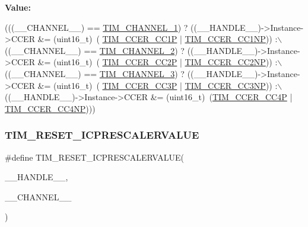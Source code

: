 {\bfseries Value\+:}
\begin{DoxyCode}
(((\_\_CHANNEL\_\_) == \hyperlink{group___t_i_m___channel_ga6b1541e4a49d62610899e24bf23f4879}{TIM\_CHANNEL\_1}) ? ((\_\_HANDLE\_\_)->Instance->CCER &= (uint16\_t)~(
      \hyperlink{group___peripheral___registers___bits___definition_ga0ca0aedba14241caff739afb3c3ee291}{TIM\_CCER\_CC1P} | \hyperlink{group___peripheral___registers___bits___definition_ga403fc501d4d8de6cabee6b07acb81a36}{TIM\_CCER\_CC1NP})) :\(\backslash\)
 ((\_\_CHANNEL\_\_) == \hyperlink{group___t_i_m___channel_ga33e02d43345a7ac5886f01b39e4f7ccd}{TIM\_CHANNEL\_2}) ? ((\_\_HANDLE\_\_)->Instance->CCER &= (uint16\_t)~(
      \hyperlink{group___peripheral___registers___bits___definition_ga3136c6e776c6066509d298b6a9b34912}{TIM\_CCER\_CC2P} | \hyperlink{group___peripheral___registers___bits___definition_ga387de559d8b16b16f3934fddd2aa969f}{TIM\_CCER\_CC2NP})) :\(\backslash\)
 ((\_\_CHANNEL\_\_) == \hyperlink{group___t_i_m___channel_ga4ea100c1789b178f3cb46721b7257e2d}{TIM\_CHANNEL\_3}) ? ((\_\_HANDLE\_\_)->Instance->CCER &= (uint16\_t)~(
      \hyperlink{group___peripheral___registers___bits___definition_ga6220a5cd34c7a7a39e10c854aa00d2e5}{TIM\_CCER\_CC3P} | \hyperlink{group___peripheral___registers___bits___definition_ga4029686d3307111d3f9f4400e29e4521}{TIM\_CCER\_CC3NP})) :\(\backslash\)
 ((\_\_HANDLE\_\_)->Instance->CCER &= (uint16\_t)~(\hyperlink{group___peripheral___registers___bits___definition_ga3faf23dc47e1b0877352d7f5a00f72e1}{TIM\_CCER\_CC4P} | 
      \hyperlink{group___peripheral___registers___bits___definition_ga41b88bff3f38cec0617ce66fa5aef260}{TIM\_CCER\_CC4NP})))
\end{DoxyCode}
\mbox{\label{group___t_i_m___private___macros_ga18ded32faf42c8981c8d2970bb02e126}} 
\subsubsection{\texorpdfstring{T\+I\+M\+\_\+\+R\+E\+S\+E\+T\+\_\+\+I\+C\+P\+R\+E\+S\+C\+A\+L\+E\+R\+V\+A\+L\+UE}{TIM\_RESET\_ICPRESCALERVALUE}}
{\footnotesize\ttfamily \#define T\+I\+M\+\_\+\+R\+E\+S\+E\+T\+\_\+\+I\+C\+P\+R\+E\+S\+C\+A\+L\+E\+R\+V\+A\+L\+UE(\begin{DoxyParamCaption}\item[{}]{\+\_\+\+\_\+\+H\+A\+N\+D\+L\+E\+\_\+\+\_\+,  }\item[{}]{\+\_\+\+\_\+\+C\+H\+A\+N\+N\+E\+L\+\_\+\+\_\+ }\end{DoxyParamCaption})}

